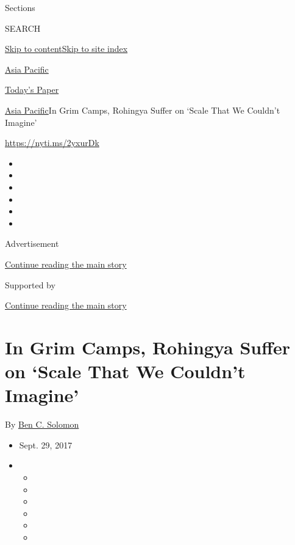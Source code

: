 Sections

SEARCH

\protect\hyperlink{site-content}{Skip to
content}\protect\hyperlink{site-index}{Skip to site index}

\href{https://www.nytimes3xbfgragh.onion/section/world/asia}{Asia
Pacific}

\href{https://myaccount.nytimes3xbfgragh.onion/auth/login?response_type=cookie\&client_id=vi}{}

\href{https://www.nytimes3xbfgragh.onion/section/todayspaper}{Today's
Paper}

\href{/section/world/asia}{Asia Pacific}\textbar{}In Grim Camps,
Rohingya Suffer on `Scale That We Couldn't Imagine'

\url{https://nyti.ms/2yxurDk}

\begin{itemize}
\item
\item
\item
\item
\item
\item
\end{itemize}

Advertisement

\protect\hyperlink{after-top}{Continue reading the main story}

Supported by

\protect\hyperlink{after-sponsor}{Continue reading the main story}

\hypertarget{in-grim-camps-rohingya-suffer-on-scale-that-we-couldnt-imagine}{%
\section{In Grim Camps, Rohingya Suffer on `Scale That We Couldn't
Imagine'}\label{in-grim-camps-rohingya-suffer-on-scale-that-we-couldnt-imagine}}

By \href{https://www.nytimes3xbfgragh.onion/by/ben-c-solomon}{Ben C.
Solomon}

\begin{itemize}
\item
  Sept. 29, 2017
\item
  \begin{itemize}
  \item
  \item
  \item
  \item
  \item
  \item
  \end{itemize}
\end{itemize}

